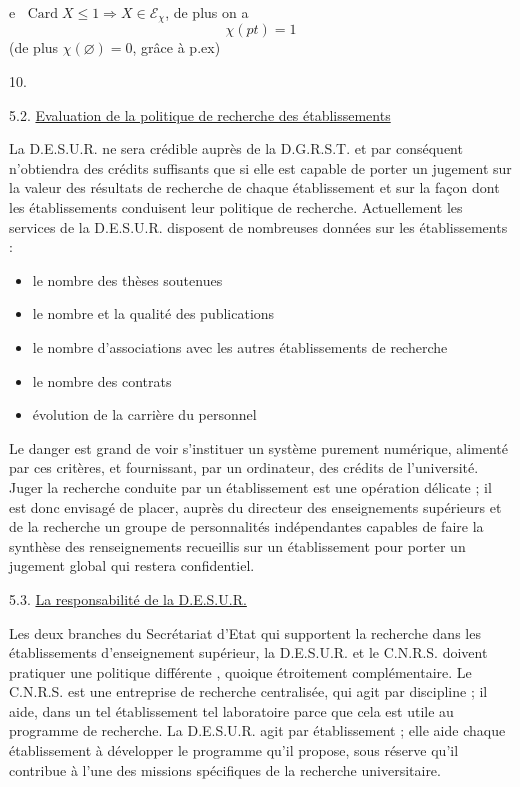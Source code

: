 \textcircled{e}  $\operatorname{Card}X\leq1\Longrightarrow X\in\mathcal{E}_{\chi}$, de plus on a
\[
\chi(pt)=1
\]
(de plus $\chi(\varnothing)=0$, grâce à  p.ex) 


10.

5.2. \uline{Evaluation de la politique de recherche des établissements}

La D.E.S.U.R. ne sera crédible auprès de la D.G.R.S.T. et par conséquent n'obtiendra des crédits suffisants que si elle est capable de porter un jugement sur la valeur des résultats de recherche de chaque établissement et sur la façon dont les établissements conduisent leur politique de recherche. Actuellement les services de la D.E.S.U.R. disposent de nombreuses données sur les établissements :

\begin{itemize}
\item[-] le nombre des thèses soutenues
\item[-] le nombre et la qualité des publications
\item[-] le nombre d'associations avec les autres établissements de recherche
\item[-] le nombre des contrats
\item[-] évolution de la carrière du personnel
\end{itemize}

Le danger est grand de voir s'instituer un système purement numérique, alimenté par ces critères, et fournissant, par un ordinateur,  des crédits de l'université. Juger la recherche conduite par un établissement est une opération délicate ; il est donc envisagé de placer, auprès du directeur des enseignements supérieurs et de la recherche un groupe de personnalités indépendantes capables de faire la synthèse des renseignements recueillis sur un établissement pour porter un jugement global qui restera confidentiel.

5.3. \uline{La responsabilité de la D.E.S.U.R.}

Les deux branches du Secrétariat d'Etat qui supportent la recherche dans les établissements d'enseignement supérieur, la D.E.S.U.R. et le C.N.R.S. doivent pratiquer une politique différente , quoique étroitement complémentaire. Le C.N.R.S. est une entreprise de recherche centralisée, qui agit par discipline ; il aide, dans un tel établissement tel laboratoire parce que cela est utile au programme de recherche. La D.E.S.U.R. agit par établissement ; elle aide chaque établissement à développer le programme qu'il propose, sous réserve qu'il contribue à l'une des missions spécifiques de la recherche universitaire.

